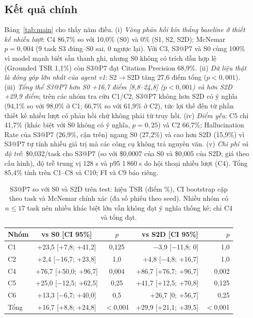 \documentclass[11pt,a4paper,twocolumn]{article}
\begin{document}
\subsection{Kết quả chính}
Bảng~\ref{tab:main} cho thấy năm điều. (i) \emph{Vòng phản hồi kín thắng baseline ở thiết kế nhiều lượt}: C4 86,7\% so với 10,0\% (S0) và 0\% (S1, S2, S2D); McNemar $p=0{,}004$ (9 task S3 đúng--S0 sai, 0 ngược lại). Với C3, S3@P7 và S0 cùng 100\% vì model mạnh biết sẵn thanh ghi, nhưng S0 không có trích dẫn hợp lệ (Grounded TSR 1,1\%) còn S3@P7 đạt Citation Precision 68,9\%. (ii) \emph{Dữ liệu thật là đóng góp lớn nhất của agent v1}: S2$\to$S2D tăng 27,6 điểm tổng ($p<0{,}001$). (iii) \emph{Tổng thể S3@P7 hơn S0 +16,7 điểm [8,8--24,8] ($p<0{,}001$) và hơn S2D +29,9 điểm}; trên các nhóm tra cứu C1/C2, S3@P7 không hơn S2D có ý nghĩa (94,1\% so với 98,0\% ở C1; 66,7\% so với 61,9\% ở C2), tức lợi thế đến từ phần thiết kế nhiều lượt có phản hồi chứ không phải từ truy hồi. (iv) \emph{Điểm yếu}: C5 chỉ 41,7\% (khác biệt với S0 không có ý nghĩa, $p=0{,}25$) và C2 66,7\%; Hallucination Rate của S3@P7 (26,9\%, cận trên) ngang S0 (27,2\%) và cao hơn S2D (15,9\%) vì S3@P7 tự tính nhiều giá trị mà các công cụ không trả nguyên văn. (v) \emph{Chi phí và độ trễ}: \$0{,}032/task cho S3@P7 (so với \$0{,}0007 của S0 và \$0{,}005 của S2D; giá theo cấu hình), độ trễ trung vị 128 s và p95 1\,860 s do hội thoại nhiều lượt (C4). Tổng 85,4\% tính trên C1--C8 và C10; FI và C9 báo riêng.
\begin{table}[h]\centering\scriptsize\setlength{\tabcolsep}{2pt}\begin{tabularx}{\columnwidth}{@{}lccrr@{}}\toprule
Nhóm & vs S0 [CI 95\%] & $p$ & vs S2D [CI 95\%] & $p$\\\midrule
C1 & +23,5 [+7,8; +41,2] & 0,125 & $-$3,9 [$-$11,8; 0] & 1,0\\
C2 & +2,4 [$-$16,7; +23,8] & 1,0 & +4,8 [$-$4,8; +16,7] & 1,0\\
C4 & +76,7 [+50,0; +96,7] & 0,004 & +86,7 [+76,7; +96,7] & 0,002\\
C5 & +25,0 [$-$12,5; +62,5] & 0,25 & +41,7 [+12,5; +70,8] & 0,125\\
C6 & +13,3 [$-$6,7; +40,0] & 0,5 & +26,7 [0; +56,7] & 0,25\\
Tổng & +16,7 [+8,8; +24,8] & $<$0,001 & +29,9 [+21,1; +39,5] & $<$0,001\\\bottomrule\end{tabularx}
\caption{S3@P7 so với S0 và S2D trên test: hiệu TSR (điểm \%), CI bootstrap cặp theo task và McNemar chính xác (đa số phiếu theo seed). Nhiều nhóm có $n\le 17$ task nên nhiều khác biệt lớn vẫn không đạt ý nghĩa thống kê; chỉ C4 và tổng đạt.}\label{tab:pair}\end{table}
\end{document}
